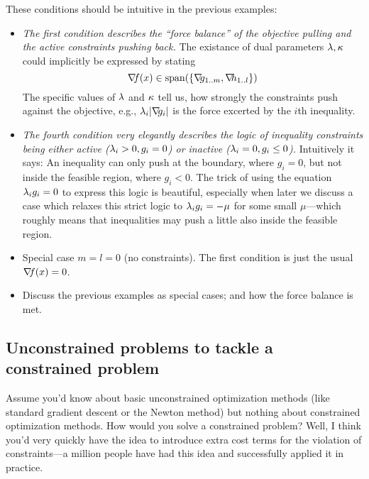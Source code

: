 These conditions should be intuitive in the previous examples:
\begin{itemize}
\item \emph{The first condition describes the ``force balance'' of the
  objective pulling and the active constraints pushing back.} The
  existance of dual parameters $\lambda,\kappa$ could implicitly be expressed
  by stating
\begin{equation}
{\nabla_{\!\!}} f (x) \in \operatorname{span}(\{ {\nabla_{\!\!}} g_{1..m}, {\nabla_{\!\!}} h_{1..l}\})
\end{equation}
The specific values of $\lambda$ and $\kappa$ tell us, how strongly the
  constraints push against the objective, e.g., $\lambda_i |{\nabla_{\!\!}} g_i|$ is
  the force excerted by the $i$th inequality.

\item \emph{The fourth condition very elegantly describes the logic of
  inequality constraints being either active ($\lambda_i>0, g_i=0$) or
  inactive ($\lambda_i=0, g_i\le 0$).} Intuitively it says: An inequality
  can only push at the boundary, where $g_i=0$, but not inside the feasible
  region, where $g_i<0$.  The trick of using the equation $\lambda_i g_i=0$ to
  express this logic is beautiful, especially when later we 
  discuss a case which relaxes this strict logic to $\lambda_i g_i=-\mu$ for
  some small $\mu$---which roughly means that inequalities
  may push a little also inside the feasible region.

\item Special case $m=l=0$ (no constraints). The first condition is
  just the usual ${\nabla_{\!\!}} f(x)=0$.

\item Discuss the previous examples as special cases; and how the
  force balance is met.
\end{itemize}


\subsection{Unconstrained problems to tackle a constrained problem}

Assume you'd know about basic unconstrained optimization methods (like
standard gradient descent or the Newton method) but nothing about
constrained optimization methods. How would you solve a constrained
problem? Well, I think you'd very quickly have the idea to introduce
extra cost terms for the violation of constraints---a million people have
had this idea and successfully applied it in practice.

